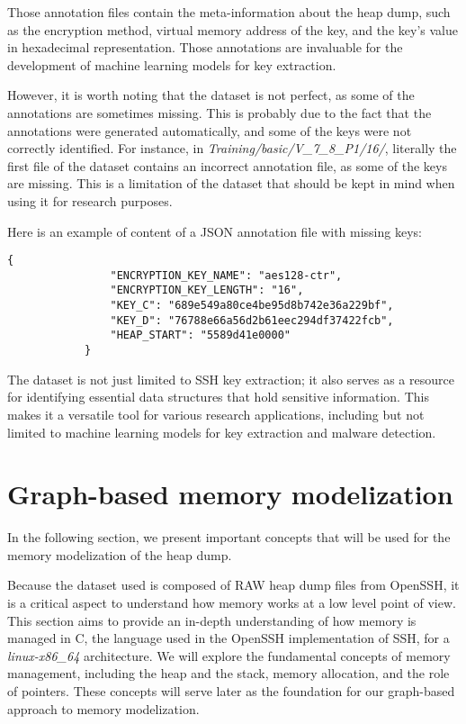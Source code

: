     Those annotation files contain the meta-information about the heap dump, such as the encryption method, virtual memory address of the key, and the key's value in hexadecimal representation. Those annotations are invaluable for the development of machine learning models for key extraction. 
    
    However, it is worth noting that the dataset is not perfect, as some of the annotations are sometimes missing. This is probably due to the fact that the annotations were generated automatically, and some of the keys were not correctly identified. For instance, in \textit{Training/basic/V\_7\_8\_P1/16/}, literally the first file of the dataset contains an incorrect annotation file, as some of the keys are missing. This is a limitation of the dataset that should be kept in mind when using it for research purposes.

    \begin{minipage}{\dimexpr\linewidth-20pt}
        Here is an example of content of a JSON annotation file with missing keys:

        \begin{lstlisting}[style=json, caption={Missing keys in JSON annotation file \textit{Training/basic/V\_6\_0\_P1/16/24375-1644243522.json}}]
            {
                "ENCRYPTION_KEY_NAME": "aes128-ctr",
                "ENCRYPTION_KEY_LENGTH": "16",
                "KEY_C": "689e549a80ce4be95d8b742e36a229bf",
                "KEY_D": "76788e66a56d2b61eec294df37422fcb",
                "HEAP_START": "5589d41e0000"
            }
        \end{lstlisting}
    \end{minipage}   

    The dataset is not just limited to SSH key extraction; it also serves as a resource for identifying essential data structures that hold sensitive information. This makes it a versatile tool for various research applications, including but not limited to machine learning models for key extraction and malware detection.

\section{Graph-based memory modelization}\label{sec:background:graph}

    In the following section, we present important concepts that will be used for the memory modelization of the heap dump.

    Because the dataset used is composed of RAW heap dump files from OpenSSH, it is a critical aspect to understand how memory works at a low level point of view. This section aims to provide an in-depth understanding of how memory is managed in C, the language used in the OpenSSH implementation of SSH, for a \textit{linux-x86\_64} architecture. We will explore the fundamental concepts of memory management, including the heap and the stack, memory allocation, and the role of pointers. These concepts will serve later as the foundation for our graph-based approach to memory modelization.

